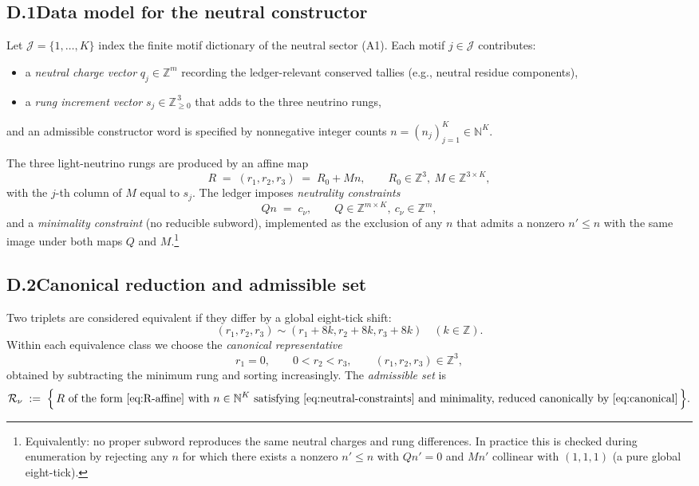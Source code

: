 \documentclass[11pt]{article}
\begin{document}
\subsection*{D.1\quad Data model for the neutral constructor}

Let $\mathcal{J}=\{1,\dots,K\}$ index the finite motif dictionary of the neutral sector (A1). Each motif $j\in\mathcal{J}$ contributes:

\begin{itemize}
  \item a \emph{neutral charge vector} $q_j\in\mathbb{Z}^m$ recording the ledger-relevant conserved tallies (e.g., neutral residue components),
  \item a \emph{rung increment vector} $s_j\in\mathbb{Z}_{\ge 0}^{\,3}$ that adds to the three neutrino rungs,
\end{itemize}
and an admissible constructor word is specified by nonnegative integer counts $n=(n_j)_{j=1}^K\in\mathbb{N}^K$.

The three light-neutrino rungs are produced by an affine map
\begin{equation}\label{eq:R-affine}
R\;=\;(r_1,r_2,r_3)\;=\;R_0+M n,\qquad R_0\in\mathbb{Z}^{3},\ M\in\mathbb{Z}^{3\times K},
\end{equation}
with the $j$-th column of $M$ equal to $s_j$. The ledger imposes \emph{neutrality constraints}
\begin{equation}\label{eq:neutral-constraints}
Q n \;=\; c_\nu,\qquad Q\in\mathbb{Z}^{m\times K},\ c_\nu\in\mathbb{Z}^{m},
\end{equation}
and a \emph{minimality constraint} (no reducible subword), implemented as the exclusion of any $n$ that admits a nonzero $n'\le n$ with the same image under both maps $Q$ and $M$.\footnote{Equivalently: no proper subword reproduces the same neutral charges and rung differences. In practice this is checked during enumeration by rejecting any $n$ for which there exists a nonzero $n'\le n$ with $Qn'=0$ and $Mn'$ collinear with $(1,1,1)$ (a pure global eight-tick).}

\subsection*{D.2\quad Canonical reduction and admissible set}

Two triplets are considered equivalent if they differ by a global eight-tick shift:
\[
(r_1,r_2,r_3)\sim(r_1+8k,r_2+8k,r_3+8k)\quad(k\in\mathbb{Z}).
\]
Within each equivalence class we choose the \emph{canonical representative}
\begin{equation}\label{eq:canonical}
r_1=0,\qquad 0<r_2<r_3,\qquad (r_1,r_2,r_3)\in\mathbb{Z}^3,
\end{equation}
obtained by subtracting the minimum rung and sorting increasingly. The \emph{admissible set} is
\begin{equation}\label{eq:Rset}
\mathcal{R}_\nu\;:=\;\Bigl\{\,R\ \text{of the form \eqref{eq:R-affine} with $n\in\mathbb{N}^K$ satisfying \eqref{eq:neutral-constraints} and minimality, reduced canonically by \eqref{eq:canonical}}\,\Bigr\}.
\end{equation}
\end{document}
